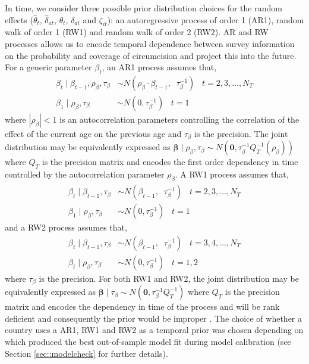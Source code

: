 \documentclass{article}
\begin{document}
\begin{appendix}
In time, we consider three possible prior distribution choices for the random effects ($\hat{\theta}_t$, $\hat{\delta}_{at}$, $\theta_t$, $\delta_{at}$ and $\zeta_{it}$): an autoregressive process of order 1 (AR1), random walk of order 1 (RW1) and random walk of order 2 (RW2). AR and RW processes allows us to encode temporal dependence between survey information on the probability and coverage of circumcision and project this into the future. For a generic parameter $\beta_t$, an AR1 process assumes that,
\begin{align*} 
  \beta_{t} \; | \; \beta_{t-1}, \rho_{\beta}, \tau_{\beta} &\sim N(\rho_{\beta} \cdot \beta_{t-1}, \;\; \tau^{-1}_{\beta}) \;\;\;  t = 2, 3,\ldots, N_T \\
  \beta_{1} \; | \; \rho_{\beta}, \tau_{\beta} &\sim N(0, \tau^{-1}_{\beta})  \;\;\;  t = 1
\end{align*}
where $|\rho_{\beta}| < 1$ is an autocorrelation parameters controlling the correlation of the effect of the current age on the previous age and $\tau_{\beta}$ is the precision. The joint distribution may be equivalently expressed as $\boldsymbol{\beta}\; | \; \rho_{\beta}, \tau_{\beta} \sim N(\boldsymbol{0}, \tau_{\beta}^{-1}Q^{-1}_{T}(\rho_{\beta}))$ where $Q_{T}$ is the precision matrix and encodes the first order dependency in time controlled by the autocorrelation parameter $\rho_{\beta}$. A RW1 process assumes that,
\begin{align*} 
  \beta_{t} \; | \; \beta_{t-1}, \tau_{\beta} &\sim N(\beta_{t-1}, \;\; \tau^{-1}_{\beta}) \;\;\;  t = 2, 3,\ldots, N_T \\
  \beta_{1} \; | \; \rho_{\beta}, \tau_{\beta} &\sim N(0, \tau^{-1}_{\beta})  \;\;\;  t = 1
\end{align*}
and a RW2 process assumes that,
\begin{align*} 
  \beta_{t} \; | \; \beta_{t-1}, \tau_{\beta} &\sim N(\beta_{t-1}, \;\; \tau^{-1}_{\beta}) \;\;\;  t = 3, 4,\ldots, N_T \\
  \beta_{t} \; | \; \rho_{\beta}, \tau_{\beta} &\sim N(0, \tau^{-1}_{\beta})  \;\;\;  t = 1, 2
\end{align*}
where $\tau_{\beta}$ is the precision. For both RW1 and RW2, the joint distribution may be equivalently expressed as $\boldsymbol{\beta}\; | \; \tau_{\beta} \sim N(\boldsymbol{0}, \tau_{\beta}^{-1}Q^{-1}_{T})$ where $Q_{T}$ is the precision matrix and encodes the dependency in time of the process and will be rank deficient and consequently the prior would be improper \cite{rue2005gaussian}. The choice of whether a country uses a AR1, RW1 and RW2 as a temporal prior was chosen depending on which produced the best out-of-sample model fit during model calibration (see Section \ref{sec::modelcheck} for further details). 


\end{appendix}
\end{document}
